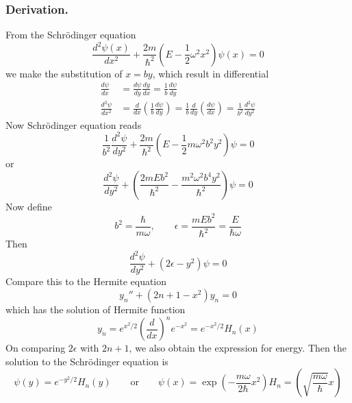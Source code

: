 \documentclass[../../../main.tex]{subfiles}
\begin{document}
\subsubsection{Derivation.}
From the Schrödinger equation
\begin{equation*}
  \frac{d^{2}\psi(x)}{dx^{2}} + \frac{2m }{\hbar^2 }\left(E- \frac{1 }{2}\omega^{2}x^{2}\right)\psi(x)=0
\end{equation*}
we make the substitution of $x=by$, which result in differential
\begin{align*}
  \frac{d\psi }{dx}       & =\frac{d\psi }{dy}\frac{dy }{dx}=\frac{1 }{b }\frac{d\psi }{dy} \\
  \frac{d^2 \psi }{dx^2 } & = \frac{d }{dx }\left( \frac{1 }{b }\frac{d\psi }{dy} \right)
  =\frac{1 }{b} \frac{d }{dy }\left( \frac{d\psi }{dx} \right) =\frac{1 }{b^2 }\frac{d^2\psi }{dy^2}
\end{align*}
Now Schrödinger equation reads
\begin{equation*}
  \frac{1 }{b^2 }\frac{d^2\psi }{dy^2 }+\frac{2m }{\hbar^2 }\left( E-\frac{1 }{2 }m\omega^2b^2y^2   \right) \psi=0
\end{equation*}
or
\begin{equation*}
  \frac{d^2\psi }{dy^2 }+\left( \frac{2mEb^2 }{\hbar^2 }-\frac{m^2\omega^2b^4y^2 }{\hbar^2}   \right) \psi=0
\end{equation*}
Now define
\begin{equation*}
  b^2=\frac{\hbar }{m\omega}, \qquad
  \epsilon=\frac{mEb^2 }{\hbar^2}=\frac{E }{\hbar\omega}
\end{equation*}
Then
\begin{equation*}
  \frac{d^2 \psi}{dy^2}+(2\epsilon-y^2)\psi=0
\end{equation*}
Compare this to the Hermite equation
\begin{equation*}
  y_n''+(2n+1-x^2)y_n=0
\end{equation*}
which has the solution of Hermite function
\begin{equation*}
  y_n=e^{x^2/2}\left(\frac{d}{dx}\right)^ne^{-x^2}=e^{-x^2/2}H_n(x)
\end{equation*}
On comparing $2\epsilon$ with $2n+1$, we also obtain the expression for energy.
Then the solution to the Schrödinger equation is
\begin{equation*}
  \psi(y)=e^{-y^2/2}H_n(y)\qquad\text{or}\qquad
  \psi(x)=\exp \left( -\frac{m\omega }{2 \hbar}x^2 \right)
  H_n = \left( \sqrt{\frac{m \omega }{\hbar }} x \right)
\end{equation*}
\end{document}
